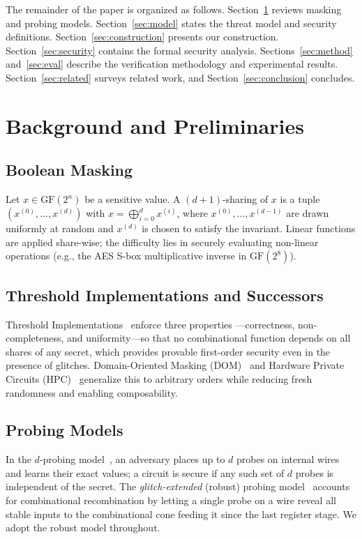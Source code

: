\documentclass[lettersize,journal]{IEEEtran}
\newcommand{\GF}{\mathrm{GF}}
\newcommand{\share}[2]{#1^{(#2)}}
\begin{document}
The remainder of the paper is organized as follows.
Section~\ref{sec:background} reviews masking and probing models.
Section~\ref{sec:model} states the threat model and security definitions.
Section~\ref{sec:construction} presents our construction.
Section~\ref{sec:security} contains the formal security analysis.
Sections~\ref{sec:method} and~\ref{sec:eval} describe the verification
methodology and experimental results. Section~\ref{sec:related} surveys related
work, and Section~\ref{sec:conclusion} concludes.

\section{Background and Preliminaries}
\label{sec:background}

\subsection{Boolean Masking}
Let $x \in \GF(2^n)$ be a sensitive value. A $(d{+}1)$-sharing of $x$ is a tuple
$(\share{x}{0},\dots,\share{x}{d})$ with
$x = \bigoplus_{i=0}^{d}\share{x}{i}$, where $\share{x}{0},\dots,\share{x}{d-1}$
are drawn uniformly at random and $\share{x}{d}$ is chosen to satisfy the
invariant. Linear functions are applied share-wise; the difficulty lies in
securely evaluating non-linear operations (e.g., the AES S-box multiplicative
inverse in $\GF(2^8)$).

\subsection{Threshold Implementations and Successors}
Threshold Implementations~\cite{nikova2006threshold} enforce three properties
---correctness, non-completeness, and uniformity---so that no combinational
function depends on all shares of any secret, which provides provable
first-order security even in the presence of glitches. Domain-Oriented Masking
(DOM)~\cite{gross2016dom} and Hardware Private Circuits
(HPC)~\cite{cassiers2020hpc} generalize this to arbitrary orders while reducing
fresh randomness and enabling composability.

\subsection{Probing Models}
In the $d$-probing model~\cite{ishai2003private}, an adversary places up to $d$
probes on internal wires and learns their exact values; a circuit is secure if
any such set of $d$ probes is independent of the secret. The
\emph{glitch-extended} (robust) probing model~\cite{faust2018composable}
accounts for combinational recombination by letting a single probe on a wire
reveal all stable inputs to the combinational cone feeding it since the last
register stage. We adopt the robust model throughout.
\end{document}

